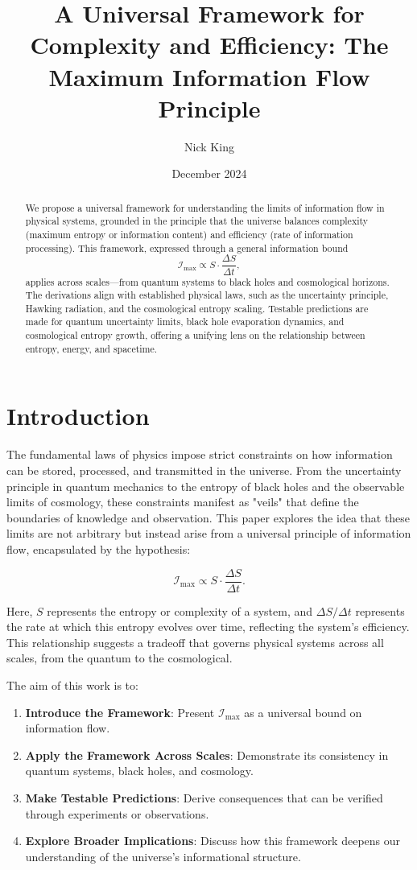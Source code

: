 \documentclass[12pt]{article}
\title{A Universal Framework for Complexity and Efficiency: The Maximum Information Flow Principle}
\author{Nick King}
\date{December 2024}
\begin{document}
\maketitle

\begin{abstract}
We propose a universal framework for understanding the limits of information flow in physical systems, grounded in the principle that the universe balances complexity (maximum entropy or information content) and efficiency (rate of information processing). This framework, expressed through a general information bound 
\[
\mathcal{I}_{\text{max}} \propto S \cdot \frac{\Delta S}{\Delta t},
\]
applies across scales—from quantum systems to black holes and cosmological horizons. The derivations align with established physical laws, such as the uncertainty principle, Hawking radiation, and the cosmological entropy scaling. Testable predictions are made for quantum uncertainty limits, black hole evaporation dynamics, and cosmological entropy growth, offering a unifying lens on the relationship between entropy, energy, and spacetime.
\end{abstract}

\section{Introduction}
The fundamental laws of physics impose strict constraints on how information can be stored, processed, and transmitted in the universe. From the uncertainty principle in quantum mechanics to the entropy of black holes and the observable limits of cosmology, these constraints manifest as "veils" that define the boundaries of knowledge and observation. This paper explores the idea that these limits are not arbitrary but instead arise from a universal principle of information flow, encapsulated by the hypothesis:

\[
\mathcal{I}_{\text{max}} \propto S \cdot \frac{\Delta S}{\Delta t}.
\]

Here, \( S \) represents the entropy or complexity of a system, and \( \Delta S / \Delta t \) represents the rate at which this entropy evolves over time, reflecting the system’s efficiency. This relationship suggests a tradeoff that governs physical systems across all scales, from the quantum to the cosmological.

The aim of this work is to:
\begin{enumerate}
    \item \textbf{Introduce the Framework}: Present \( \mathcal{I}_{\text{max}} \) as a universal bound on information flow.
    \item \textbf{Apply the Framework Across Scales}: Demonstrate its consistency in quantum systems, black holes, and cosmology.
    \item \textbf{Make Testable Predictions}: Derive consequences that can be verified through experiments or observations.
    \item \textbf{Explore Broader Implications}: Discuss how this framework deepens our understanding of the universe’s informational structure.
\end{enumerate}
\end{document}
